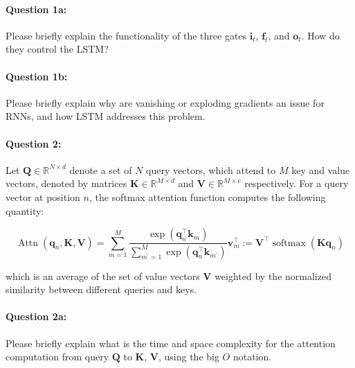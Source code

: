 \documentclass[10pt]{article}
\begin{document}
\paragraph{Question 1a:} Please briefly explain the functionality of the three gates $\mathbf{i}_t$, $\mathbf{f}_t$, and $\mathbf{o}_t$. How do they control the LSTM?


\paragraph{Question 1b:} Please briefly explain why are vanishing or exploding gradients an issue for RNNs, and how LSTM addresses this problem.
\newpage

\paragraph{Question 2:} Let $\mathbf{Q} \in \mathbb{R}^{N \times d}$ denote a set of $N$ query vectors, which attend to $M$ key and value vectors, denoted by matrices $\mathbf{K} \in \mathbb{R}^{M \times d}$ and $\mathbf{V} \in \mathbb{R}^{M \times c}$ respectively. For a query vector at position $n$, the softmax attention function computes the following quantity:

$$
  \operatorname{Attn}\left(\mathbf{q}_{n}, \mathbf{K}, \mathbf{V}\right)=\sum_{m=1}^{M} \frac{\exp \left(\mathbf{q}_{n}^{\top} \mathbf{k}_{m}\right)}{\sum_{m^{\prime}=1}^{M} \exp \left(\mathbf{q}_{n}^{\top} \mathbf{k}_{m^{\prime}}\right)} \mathbf{v}_{m}^{\top}:=\mathbf{V}^{\top} \operatorname{softmax}\left(\mathbf{K} \mathbf{q}_{n}\right)
$$

which is an average of the set of value vectors $\mathbf{V}$ weighted by the normalized similarity between different queries and keys.

\paragraph{Question 2a:} Please briefly explain what is the time and space complexity for the attention computation from query $\mathbf{Q}$ to $\mathbf{K}$, $\mathbf{V}$, using the big $O$ notation.


\newpage
\end{document}
